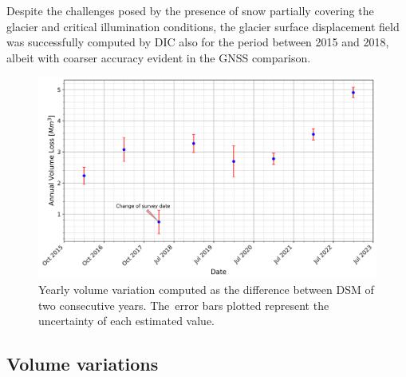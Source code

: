 Despite the challenges posed by the presence of snow partially covering the glacier and critical illumination conditions, the glacier surface displacement field was successfully computed by DIC also for the period between 2015 and 2018, albeit with coarser accuracy evident in the GNSS comparison.

\begin{figure}[ht]
    \centering
    \includegraphics[width=1\columnwidth]{volume_loss_2015-2023.png}
    \caption{Yearly volume variation computed as the difference between DSM of two
        consecutive years. The~error bars plotted represent the uncertainty of each
        estimated value.}
    \label{fig:3:volumes}
\end{figure}

\subsection{Volume variations}\label{sec:3:res:volumes}

